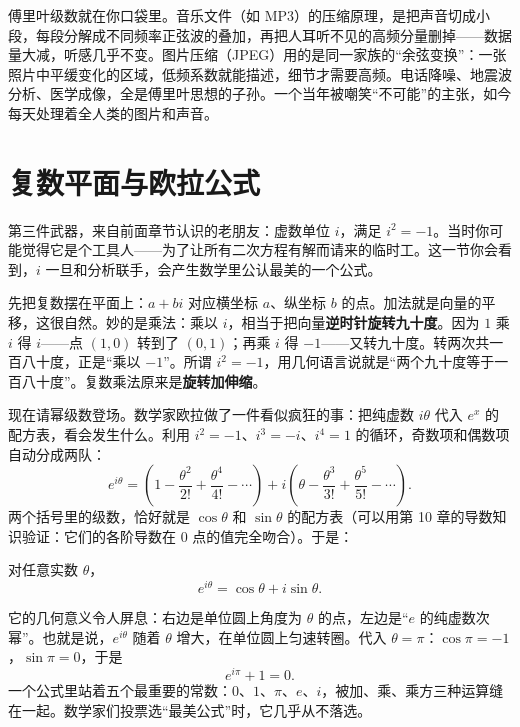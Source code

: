 \begin{lianjie}
傅里叶级数就在你口袋里。音乐文件（如 MP3）的压缩原理，是把声音切成小段，每段分解成不同频率正弦波的叠加，再把人耳听不见的高频分量删掉——数据量大减，听感几乎不变。图片压缩（JPEG）用的是同一家族的“余弦变换”：一张照片中平缓变化的区域，低频系数就能描述，细节才需要高频。电话降噪、地震波分析、医学成像，全是傅里叶思想的子孙。一个当年被嘲笑“不可能”的主张，如今每天处理着全人类的图片和声音。
\end{lianjie}

\section{复数平面与欧拉公式}

第三件武器，来自前面章节认识的老朋友：虚数单位 $i$，满足 $i^2=-1$。当时你可能觉得它是个工具人——为了让所有二次方程有解而请来的临时工。这一节你会看到，$i$ 一旦和分析联手，会产生数学里公认最美的一个公式。

先把复数摆在平面上：$a+bi$ 对应横坐标 $a$、纵坐标 $b$ 的点。加法就是向量的平移，这很自然。妙的是乘法：乘以 $i$，相当于把向量\textbf{逆时针旋转九十度}。因为 $1$ 乘 $i$ 得 $i$——点 $(1,0)$ 转到了 $(0,1)$；再乘 $i$ 得 $-1$——又转九十度。转两次共一百八十度，正是“乘以 $-1$”。所谓 $i^2=-1$，用几何语言说就是“两个九十度等于一百八十度”。复数乘法原来是\textbf{旋转加伸缩}。

现在请幂级数登场。数学家欧拉做了一件看似疯狂的事：把纯虚数 $i\theta$ 代入 $e^x$ 的配方表，看会发生什么。利用 $i^2=-1$、$i^3=-i$、$i^4=1$ 的循环，奇数项和偶数项自动分成两队：
\[
e^{i\theta}=\left(1-\frac{\theta^2}{2!}+\frac{\theta^4}{4!}-\cdots\right)
+i\left(\theta-\frac{\theta^3}{3!}+\frac{\theta^5}{5!}-\cdots\right).
\]
两个括号里的级数，恰好就是 $\cos\theta$ 和 $\sin\theta$ 的配方表（可以用第 10 章的导数知识验证：它们的各阶导数在 $0$ 点的值完全吻合）。于是：

\begin{dingli}[欧拉公式]
对任意实数 $\theta$，
\[
e^{i\theta}=\cos\theta+i\sin\theta .
\]
\end{dingli}

它的几何意义令人屏息：右边是单位圆上角度为 $\theta$ 的点，左边是“$e$ 的纯虚数次幂”。也就是说，$e^{i\theta}$ 随着 $\theta$ 增大，在单位圆上匀速转圈。代入 $\theta=\pi$：$\cos\pi=-1$，$\sin\pi=0$，于是
\[
e^{i\pi}+1=0 .
\]
一个公式里站着五个最重要的常数：$0$、$1$、$\pi$、$e$、$i$，被加、乘、乘方三种运算缝在一起。数学家们投票选“最美公式”时，它几乎从不落选。

\begin{center}
\end{center}


